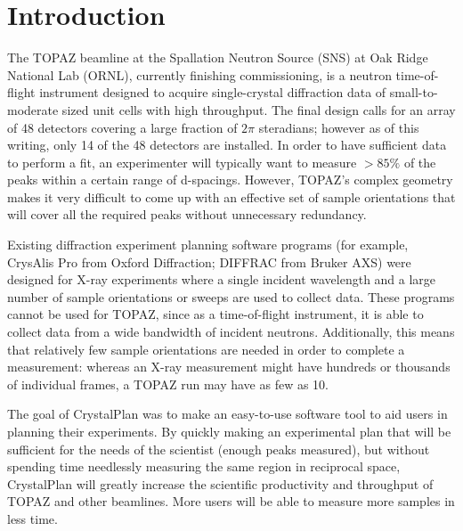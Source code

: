 \documentclass[draft]{iucr}              %
\begin{document}
\section{Introduction}

The TOPAZ beamline at the Spallation Neutron Source (SNS) at Oak Ridge National
Lab (ORNL), currently finishing commissioning, is a neutron time-of-flight
instrument designed to acquire single-crystal diffraction data of
small-to-moderate sized unit cells with high throughput. The final design calls
for an array of 48 detectors covering a large fraction of  $2\pi$ steradians;
however as of this writing, only 14 of the 48 detectors are installed. In order
to have sufficient data to perform a fit, an experimenter will  typically want
to measure $ > 85\%$ of the peaks within a certain range of d-spacings. 
However, TOPAZ's complex geometry makes it very difficult to come up with an
effective set of sample orientations that will cover all the required peaks
without unnecessary redundancy. 


Existing diffraction experiment planning software programs (for example,
CrysAlis Pro from Oxford Diffraction; DIFFRAC from Bruker AXS) were designed for
X-ray experiments where a single  incident wavelength and a large number of
sample orientations or sweeps are used to collect data. 
These programs cannot be used for TOPAZ, since as a time-of-flight instrument, 
it is able to collect data from a wide bandwidth of incident neutrons. 
Additionally, this means that relatively few sample orientations are needed in
order to complete a measurement: whereas an X-ray measurement might have
hundreds or thousands of individual frames, a TOPAZ run may have as few as 10.   


The goal of CrystalPlan was to make an easy-to-use software tool to aid users in
planning their experiments. By quickly making an experimental plan that will be
sufficient for the needs of the scientist (enough peaks measured), but without
spending time needlessly measuring the same region in reciprocal space,
CrystalPlan will greatly increase the scientific productivity and throughput of
TOPAZ and other beamlines. More users will be able to measure more samples in
less time.

\end{document}
